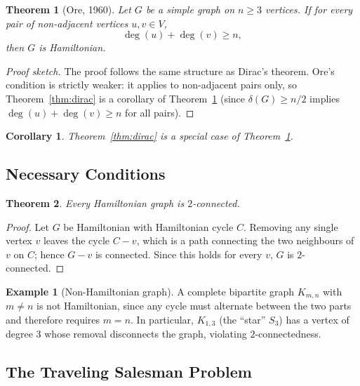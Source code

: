 \documentclass[12pt,a4paper]{article}
\theoremstyle{definition}
\newtheorem{example}{Example}[section]
\theoremstyle{plain}
\newtheorem{theorem}{Theorem}[section]
\newtheorem{corollary}{Corollary}[section]
\theoremstyle{remark}
\begin{document}
\begin{theorem}[Ore, 1960]\label{thm:ore}
Let $G$ be a simple graph on $n \geq 3$ vertices. If for every pair of non-adjacent
vertices $u, v \in V$,
\begin{equation}
  \deg(u) + \deg(v) \geq n,
\end{equation}
then $G$ is Hamiltonian.
\end{theorem}

\begin{proof}[Proof sketch]
The proof follows the same structure as Dirac's theorem. Ore's condition is strictly
weaker: it applies to non-adjacent pairs only, so Theorem~\ref{thm:dirac} is a
corollary of Theorem~\ref{thm:ore} (since $\delta(G) \geq n/2$ implies
$\deg(u) + \deg(v) \geq n$ for all pairs).
\end{proof}

\begin{corollary}\label{cor:dirac-ore}
Theorem~\ref{thm:dirac} is a special case of Theorem~\ref{thm:ore}.
\end{corollary}

\subsection{Necessary Conditions}

\begin{theorem}\label{thm:ham-2connected}
Every Hamiltonian graph is $2$-connected.
\end{theorem}

\begin{proof}
Let $G$ be Hamiltonian with Hamiltonian cycle $C$. Removing any single vertex $v$
leaves the cycle $C - v$, which is a path connecting the two neighbours of $v$ on $C$;
hence $G - v$ is connected. Since this holds for every $v$, $G$ is $2$-connected.
\end{proof}

\begin{example}[Non-Hamiltonian graph]\label{ex:non-ham}
A complete bipartite graph $K_{m,n}$ with $m \neq n$ is not Hamiltonian, since any
cycle must alternate between the two parts and therefore requires $m = n$. In particular,
$K_{1,3}$ (the ``star'' $S_3$) has a vertex of degree $3$ whose removal disconnects the
graph, violating $2$-connectedness.
\end{example}

\subsection{The Traveling Salesman Problem}
\end{document}
